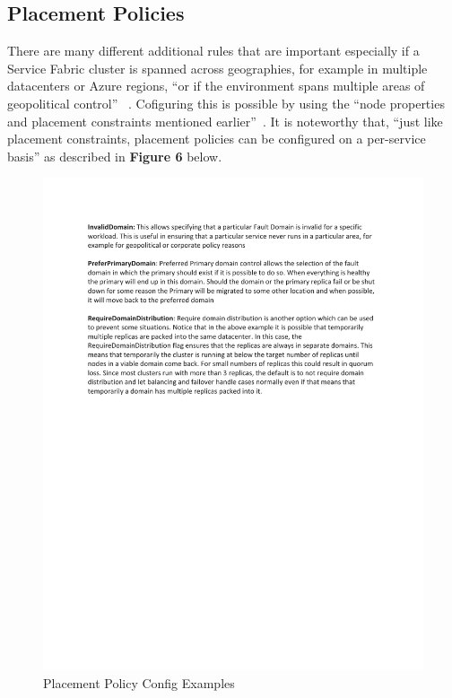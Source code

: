 \subsection{Placement Policies}
There are many different additional rules that are important
especially if a Service Fabric cluster is spanned across geographies, 
for example in multiple datacenters or Azure regions, ``or if the
environment spans multiple areas of geopolitical control''
~\cite{hid-sp18-501-placement}. Cofiguring this is possible by using the ``node 
properties and placement constraints
mentioned earlier''~\cite{hid-sp18-501-placement}. It is noteworthy that,
``just like placement constraints, placement policies can be configured
on a per-service basis'' as described in {\bf Figure 6} below.

\begin{figure}[!ht]
  \centering\includegraphics[width=\columnwidth]{images/fig6.pdf}
  \caption{Placement Policy Config Examples~\cite{hid-sp18-501-placement}}
\label{f:architecture}
\end{figure}


